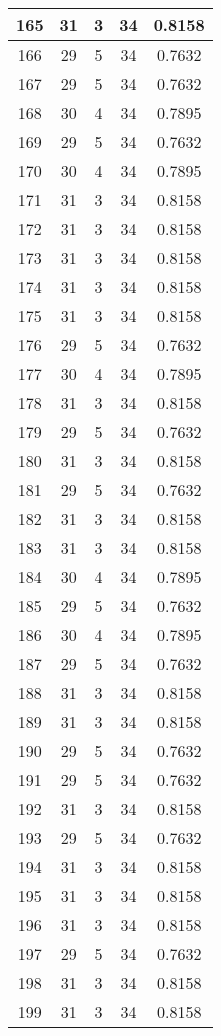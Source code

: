 \documentclass[letterpaper, 12pt]{article}
\begin{document}
\begin{longtable}{|c|c|c|c|c|}
\hline
165 & 31 & 3 & 34 & 0.8158 \\
\hline
166 & 29 & 5 & 34 & 0.7632 \\
\hline
167 & 29 & 5 & 34 & 0.7632 \\
\hline
168 & 30 & 4 & 34 & 0.7895 \\
\hline
169 & 29 & 5 & 34 & 0.7632 \\
\hline
170 & 30 & 4 & 34 & 0.7895 \\
\hline
171 & 31 & 3 & 34 & 0.8158 \\
\hline
172 & 31 & 3 & 34 & 0.8158 \\
\hline
173 & 31 & 3 & 34 & 0.8158 \\
\hline
174 & 31 & 3 & 34 & 0.8158 \\
\hline
175 & 31 & 3 & 34 & 0.8158 \\
\hline
176 & 29 & 5 & 34 & 0.7632 \\
\hline
177 & 30 & 4 & 34 & 0.7895 \\
\hline
178 & 31 & 3 & 34 & 0.8158 \\
\hline
179 & 29 & 5 & 34 & 0.7632 \\
\hline
180 & 31 & 3 & 34 & 0.8158 \\
\hline
181 & 29 & 5 & 34 & 0.7632 \\
\hline
182 & 31 & 3 & 34 & 0.8158 \\
\hline
183 & 31 & 3 & 34 & 0.8158 \\
\hline
184 & 30 & 4 & 34 & 0.7895 \\
\hline
185 & 29 & 5 & 34 & 0.7632 \\
\hline
186 & 30 & 4 & 34 & 0.7895 \\
\hline
187 & 29 & 5 & 34 & 0.7632 \\
\hline
188 & 31 & 3 & 34 & 0.8158 \\
\hline
189 & 31 & 3 & 34 & 0.8158 \\
\hline
190 & 29 & 5 & 34 & 0.7632 \\
\hline
191 & 29 & 5 & 34 & 0.7632 \\
\hline
192 & 31 & 3 & 34 & 0.8158 \\
\hline
193 & 29 & 5 & 34 & 0.7632 \\
\hline
194 & 31 & 3 & 34 & 0.8158 \\
\hline
195 & 31 & 3 & 34 & 0.8158 \\
\hline
196 & 31 & 3 & 34 & 0.8158 \\
\hline
197 & 29 & 5 & 34 & 0.7632 \\
\hline
198 & 31 & 3 & 34 & 0.8158 \\
\hline
199 & 31 & 3 & 34 & 0.8158 \\
\hline
\end{longtable}
\end{document}
